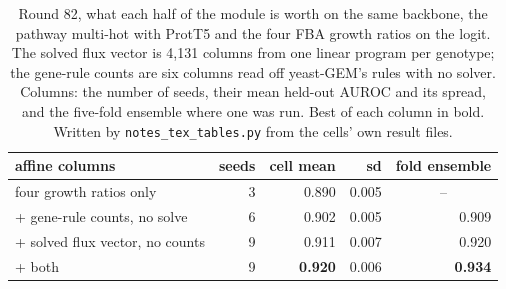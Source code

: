 \begin{table}[H]
  \centering
  \footnotesize
  \caption[Round 82: the solve and the rules, each alone]{Round 82, what each half of the module is worth on the same backbone, the pathway multi-hot with ProtT5 and the four FBA growth ratios on the logit. The solved flux vector is 4,131 columns from one linear program per genotype; the gene-rule counts are six columns read off yeast-GEM's rules with no solver. Columns: the number of seeds, their mean held-out AUROC and its spread, and the five-fold ensemble where one was run. Best of each column in bold. Written by \texttt{notes\_tex\_tables.py} from the cells' own result files.}
  \label{tab:module-factorial}
  \begin{tabular}{@{}lrrrr@{}}
    \hline
    affine columns & seeds & cell mean & sd & fold ensemble \\
    \hline
    four growth ratios only & 3 & 0.890 & 0.005 & \multicolumn{1}{c}{--} \\
    + gene-rule counts, no solve & 6 & 0.902 & 0.005 & 0.909 \\
    + solved flux vector, no counts & 9 & 0.911 & 0.007 & 0.920 \\
    + both & 9 & \textbf{0.920} & 0.006 & \textbf{0.934} \\
    \hline
  \end{tabular}
\end{table}
